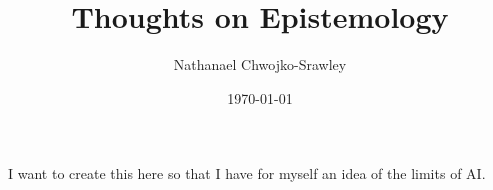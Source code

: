 \documentclass{article}
\title{Thoughts on Epistemology}
\author{Nathanael Chwojko-Srawley}
\date{\today}
\renewcommand{\maketitle}{
    \quad
    \vspace{1em}
  \begin{center}
      \LARGE\bfseries \thetitle \par
      \vspace{0.6em}
      \large
  \end{center}
    \vspace{1em}
}
\begin{document}
\maketitle

I want to create this here so that I have for myself an idea of the limits of AI.

\end{document}
